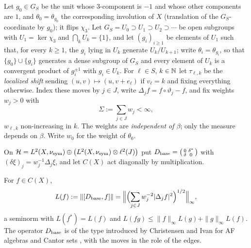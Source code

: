 \begin{definition}\label{IV:def:moves}
Let $g_0\in G_S$ be the unit whose $3$-component is $-1$ and whose other components are
$1$, and $\theta_0=\theta_{g_0}$ the corresponding involution of $X$ (translation of the
$G_S$-coordinate by $g_0$); it flips $\chi_3$. Let $G_S=U_0\supset U_1\supset U_2\supset\cdots$
be open subgroups with $U_1=\ker\chi_3$ and $\bigcap_kU_k=\{1\}$, and let $(g_i)_{i\ge1}$ be
elements of $U_1$ such that, for every $k\ge1$, the $g_i$ lying in $U_k$ generate
$U_k/U_{k+1}$; write $\theta_i=\theta_{g_i}$, so that $\{g_0\}\cup\{g_i\}$ generates a
dense subgroup of $G_S$ and every element of $U_k$ is a convergent product of $g_i^{\pm1}$
with $g_i\in U_k$. For $\ell\in S$, $k\in\mathbb{N}$ let $\tau_{\ell,k}$ be the \emph{localized shift}
sending $(u,v)\mapsto(u,v+e_\ell)$ if $v_\ell=k$ and fixing everything otherwise. Index these
moves by $j\in J$, write $\Delta_jf=f\circ\vartheta_j-f$, and fix weights $w_j>0$ with
\begin{equation}\label{IV:eq:summable}
\Sigma:=\sum_{j\in J}w_j<\infty ,
\end{equation}
$w_{\ell,k}$ non-increasing in $k$. The weights are \emph{independent of $\beta$}; only the
measure depends on $\beta$. Write $w_0$ for the weight of $\theta_0$.
\end{definition}

\begin{definition}\label{IV:def:D}
On $\mathcal H=L^2(X,\nu_{\mathrm{sym}})\oplus\bigl(L^2(X,\nu_{\mathrm{sym}})\otimes\ell^2(J)\bigr)$ put
$D_{\mathrm{base}}=\begin{psmallmatrix}0&\delta^*\\ \delta&0\end{psmallmatrix}$ with
$(\delta\xi)_j=w_j^{-1}\Delta_j\xi$, and let $C(X)$ act diagonally by multiplication.
\end{definition}

\begin{lemma}\label{IV:lem:L}
For $f\in C(X)$,
\begin{equation}\label{IV:eq:L}
L(f):=\|[D_{\mathrm{base}},f]\|=\Bigl\|\Bigl(\sum_{j\in J}w_j^{-2}|\Delta_jf|^2\Bigr)^{1/2}\Bigr\|_\infty ,
\end{equation}
a seminorm with $L(f^*)=L(f)$ and $L(fg)\le\|f\|_\infty L(g)+\|g\|_\infty L(f)$. The
operator $D_{\mathrm{base}}$ is of the type introduced by Christensen and Ivan for AF algebras and
Cantor sets \cite{CI}, with the moves in the role of the edges.
\end{lemma}

